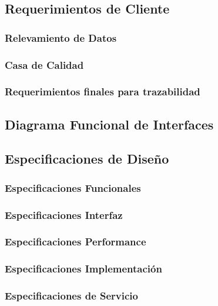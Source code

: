 



\subsection{Requerimientos de Cliente}


\subsubsection{Relevamiento de Datos}


\subsubsection{Casa de Calidad}


\subsubsection{Requerimientos finales para trazabilidad}

\subsection{Diagrama Funcional de Interfaces}

 
\subsection{Especificaciones de Diseño}

\subsubsection{Especificaciones Funcionales}
\subsubsection{Especificaciones Interfaz}
\subsubsection{Especificaciones Performance}
\subsubsection{Especificaciones Implementación}
\subsubsection{Especificaciones de Servicio}


